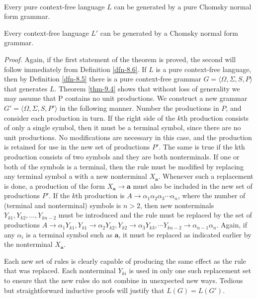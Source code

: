 \begin{thm}\label{thm-9.5}
\ \\
\indent Every pure context-free language $L$ can be generated by a pure Chomsky normal
form grammar.

Every context-free language $L'$ can be generated by a Chomsky
normal form grammar.

\emph{Proof.} Again, if the first statement of the theorem is proved, the second
will follow immediately from Definition \ref{dfn-8.6}. If $L$ is a pure context-free
language, then by Definition \ref{dfn-8.5} there is a pure context-free grammar $G=\langle
\Omega,\Sigma,S,P\rangle$ that generates $L$. Theorem \ref{thm-9.4} shows that without
loss of generality we may assume that P contains no unit productions. We
construct a new grammar $G'=\langle\Omega,\Sigma,S,P'\rangle$ in the following
manner. Number the productions in $P$, and consider each production in turn. If
the right side of the $k$th production consists of only a single symbol, then it
must be a terminal symbol, since there are no unit productions. No modifications
are necessary in this case, and the production is retained for use in the new
set of productions $P'$. The same is true if the kth production consists of two
symbols and they are both nonterminals. If one or both of the symbols is a
terminal, then the rule must be modified by replacing any terminal symbol {\pmb
a} with a new nonterminal $X_{\pmb{a}}$. Whenever such a replacement is done, a
production of the form $X_{\pmb{a}}\rightarrow\pmb{a}$ must also be included in
the new set of productions $P'$. If the $k$th production is $A\rightarrow\alpha_1
\alpha_2\alpha_3\cdots\alpha_n$, where the number of (terminal and nonterminal)
symbols is $n>2$, then new nonterminals $Y_{k1},Y_{k2},\ldots,Y_{kn-2}$ must be
introduced and the rule must be replaced by the set of productions $A\rightarrow
\alpha_1Y_{k1},Y_{k1}\rightarrow\alpha_2Y_{k2},Y_{k2}\rightarrow\alpha_3Y_{k3},
\cdots Y_{kn-2}\rightarrow \alpha_{n-1}\alpha_n$. Again, if any $\alpha_i$ is a
terminal symbol such as $\pmb{a}$, it must be replaced as indicated earlier by the
nonterminal $X_{\pmb{a}}$.

Each new set of rules is clearly capable of producing the same effect as the
rule that was replaced. Each nonterminal $Y_{ki}$ is used in only one such
replacement set to ensure that the new rules do not combine in unexpected new
ways. Tedious but straightforward inductive proofs will justify that $L(G) =
L(G')$.
\end{thm}

